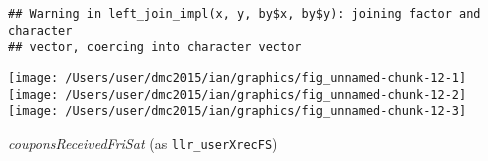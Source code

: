 \documentclass[10pt]{report}
\newenvironment{Shaded}{}{}
\newcommand{\KeywordTok}[1]{\textcolor[rgb]{0.00,0.44,0.13}{\textbf{{#1}}}}
\newcommand{\DataTypeTok}[1]{\textcolor[rgb]{0.56,0.13,0.00}{{#1}}}
\newcommand{\StringTok}[1]{\textcolor[rgb]{0.25,0.44,0.63}{{#1}}}
\newcommand{\NormalTok}[1]{{#1}}
\begin{document}
\begin{Shaded}
\end{Shaded}

\begin{verbatim}
## Warning in left_join_impl(x, y, by$x, by$y): joining factor and character
## vector, coercing into character vector
\end{verbatim}

\begin{Shaded}
\end{Shaded}

\begin{center}\texttt{[image: /Users/user/dmc2015/ian/graphics/fig\_unnamed-chunk-12-1]} \texttt{[image: /Users/user/dmc2015/ian/graphics/fig\_unnamed-chunk-12-2]} \texttt{[image: /Users/user/dmc2015/ian/graphics/fig\_unnamed-chunk-12-3]} \end{center}

\emph{couponsReceivedFriSat} (as \texttt{llr\_userXrecFS})
\end{document}
